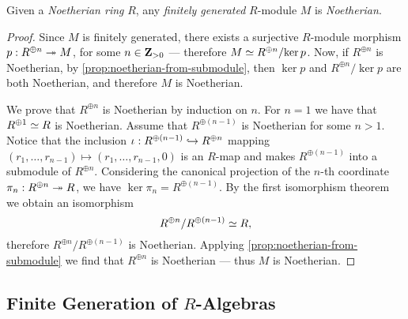 \begin{corollary}
\label{cor:noetherian-ring-fg-module-is-noetherian}
Given a \emph{Noetherian ring} \(R\), any \emph{finitely generated} \(R\)-module
\(M\) is \emph{Noetherian}.
\end{corollary}

\begin{proof}
Since \(M\) is finitely generated, there exists a surjective \(R\)-module
morphism \(p: R^{\oplus n} \twoheadrightarrow M\), for some \(n \in \mathbf{Z}_{> 0}\) --- therefore
\(M \simeq R^{\oplus n}/{\ker p}\). Now, if \(R^{\oplus n}\) is Noetherian, by
\cref{prop:noetherian-from-submodule}, then \(\ker p\) and \(R^{\oplus n}/{\ker
  p}\) are both Noetherian, and therefore \(M\) is Noetherian.

We prove that \(R^{\oplus n}\) is Noetherian by induction on \(n\). For
\(n = 1\) we have that \(R^{\oplus 1} \simeq R\) is Noetherian. Assume that
\(R^{\oplus(n - 1)}\) is Noetherian for some \(n > 1\). Notice that the
inclusion \(\iota: R^{\oplus (n-1)} \hookrightarrow R^{\oplus n}\) mapping
\((r_1, \dots, r_{n-1}) \mapsto (r_1, \dots, r_{n-1}, 0)\) is an \(R\)-map and
makes \(R^{\oplus (n-1)}\) into a submodule of \(R^{\oplus n}\). Considering the
canonical projection of the \(n\)-th coordinate \(\pi_n: R^{\oplus n} \twoheadrightarrow R\),
we have \(\ker \pi_n = R^{\oplus (n - 1)}\). By the first isomorphism theorem we
obtain an isomorphism
\[
R^{\oplus n}/R^{\oplus (n-1)} \simeq R,
\]
therefore \(R^{\oplus n}/R^{\oplus (n-1)}\) is Noetherian. Applying
\cref{prop:noetherian-from-submodule} we find that \(R^{\oplus n}\) is
Noetherian --- thus \(M\) is Noetherian.
\end{proof}

\subsection{Finite Generation of \texorpdfstring{\(R\)}{R}-Algebras}

